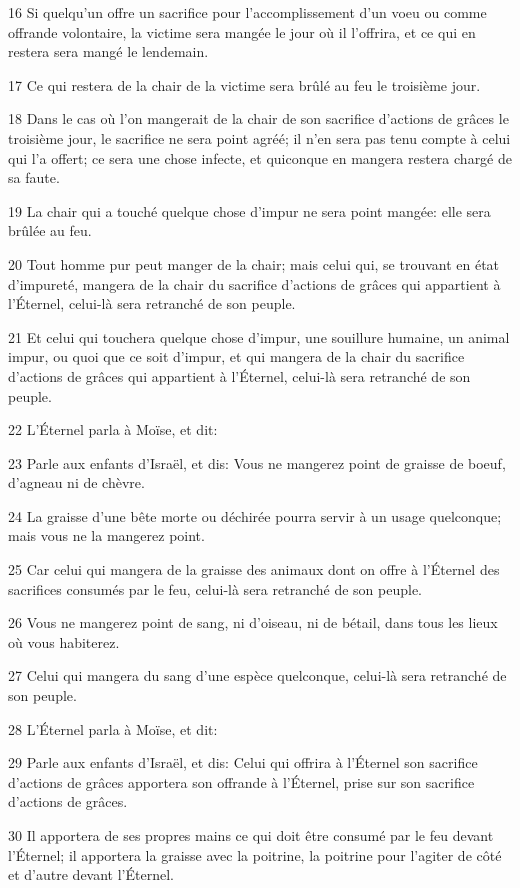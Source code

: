 \par 16 Si quelqu'un offre un sacrifice pour l'accomplissement d'un voeu ou comme offrande volontaire, la victime sera mangée le jour où il l'offrira, et ce qui en restera sera mangé le lendemain.
\par 17 Ce qui restera de la chair de la victime sera brûlé au feu le troisième jour.
\par 18 Dans le cas où l'on mangerait de la chair de son sacrifice d'actions de grâces le troisième jour, le sacrifice ne sera point agréé; il n'en sera pas tenu compte à celui qui l'a offert; ce sera une chose infecte, et quiconque en mangera restera chargé de sa faute.
\par 19 La chair qui a touché quelque chose d'impur ne sera point mangée: elle sera brûlée au feu.
\par 20 Tout homme pur peut manger de la chair; mais celui qui, se trouvant en état d'impureté, mangera de la chair du sacrifice d'actions de grâces qui appartient à l'Éternel, celui-là sera retranché de son peuple.
\par 21 Et celui qui touchera quelque chose d'impur, une souillure humaine, un animal impur, ou quoi que ce soit d'impur, et qui mangera de la chair du sacrifice d'actions de grâces qui appartient à l'Éternel, celui-là sera retranché de son peuple.
\par 22 L'Éternel parla à Moïse, et dit:
\par 23 Parle aux enfants d'Israël, et dis: Vous ne mangerez point de graisse de boeuf, d'agneau ni de chèvre.
\par 24 La graisse d'une bête morte ou déchirée pourra servir à un usage quelconque; mais vous ne la mangerez point.
\par 25 Car celui qui mangera de la graisse des animaux dont on offre à l'Éternel des sacrifices consumés par le feu, celui-là sera retranché de son peuple.
\par 26 Vous ne mangerez point de sang, ni d'oiseau, ni de bétail, dans tous les lieux où vous habiterez.
\par 27 Celui qui mangera du sang d'une espèce quelconque, celui-là sera retranché de son peuple.
\par 28 L'Éternel parla à Moïse, et dit:
\par 29 Parle aux enfants d'Israël, et dis: Celui qui offrira à l'Éternel son sacrifice d'actions de grâces apportera son offrande à l'Éternel, prise sur son sacrifice d'actions de grâces.
\par 30 Il apportera de ses propres mains ce qui doit être consumé par le feu devant l'Éternel; il apportera la graisse avec la poitrine, la poitrine pour l'agiter de côté et d'autre devant l'Éternel.
